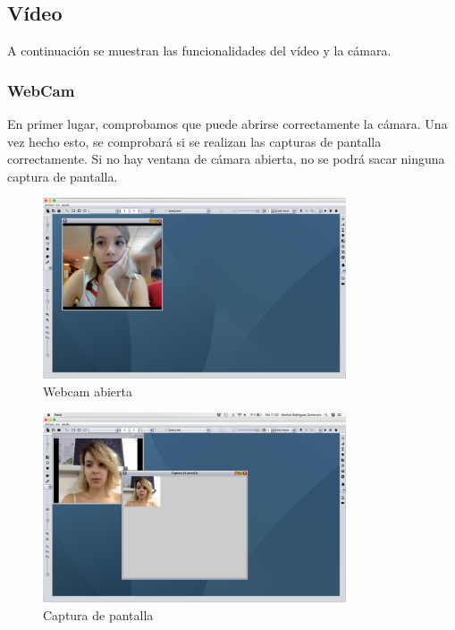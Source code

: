 \subsection{Vídeo}
A continuación se muestran las funcionalidades del vídeo y la cámara.
\subsubsection{WebCam}
En primer lugar, comprobamos que puede abrirse correctamente la cámara. Una vez hecho esto, se comprobará si se realizan las capturas de pantalla correctamente. Si no hay ventana de cámara abierta, no se podrá sacar ninguna captura de pantalla.
\vskip0.3cm
\begin{figure}[H]
 \centering
  \includegraphics[width=0.8\textwidth]{video/webcam.jpg}
 \caption{Webcam abierta}
 \label{diseño}
 \end{figure}
 \vskip0.3cm
\begin{figure}[H]
 \centering
  \includegraphics[width=0.8\textwidth]{video/captura.jpg}
 \caption{Captura de pantalla}
 \label{diseño}
 \end{figure}




